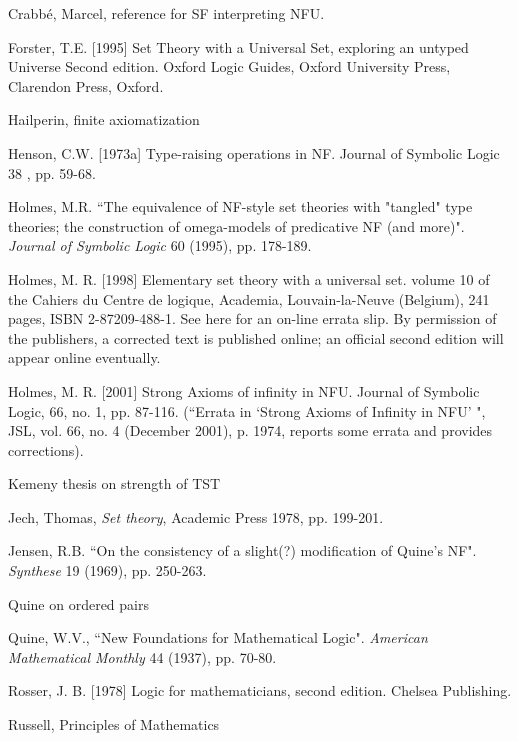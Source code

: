 \documentclass[112pt]{article}
\begin{document}
\begin{thebibliography}{99}


  Crabb\'e, Marcel, reference for SF interpreting NFU.


  Forster, T.E. [1995] 
Set Theory with a Universal Set, exploring an untyped Universe 
Second edition. Oxford Logic Guides, Oxford University Press, Clarendon Press, Oxford.

 Hailperin, finite axiomatization

   Henson, C.W. [1973a] 
Type-raising operations in NF. 
Journal of Symbolic Logic 38 , pp. 59-68.

  Holmes, M.R.
``The equivalence of NF-style set theories with "tangled" type theories; the construction of omega-models of predicative NF (and more)". 
{\em Journal of Symbolic Logic\/} 60 (1995), pp. 178-189.

  Holmes, M. R. [1998] 
Elementary set theory with a universal set. 
volume 10 of the Cahiers du Centre de logique, Academia, Louvain-la-Neuve (Belgium), 241 pages, ISBN 2-87209-488-1. See here for an on-line errata slip. By permission of the publishers, a corrected text is published online; an official second edition will appear online eventually.

   Holmes, M. R. [2001]
Strong Axioms of infinity in NFU.
Journal of Symbolic Logic, 66, no. 1, pp. 87-116.  \newline(``Errata in `Strong
Axioms of Infinity in NFU' ", JSL, vol. 66, no. 4 (December
2001), p. 1974, reports some errata and provides corrections).

  Kemeny thesis on strength of TST

  Jech, Thomas, {\em Set theory}, Academic Press 1978, pp. 199-201.

  Jensen, R.B.
``On the consistency of a slight(?) modification of Quine's NF". 
{\em Synthese\/} 19 (1969), pp. 250-263.

  Quine on ordered pairs

  Quine, W.V.,
``New Foundations for Mathematical Logic". 
{\em American Mathematical Monthly\/} 44 (1937), pp. 70-80. 

  Rosser, J. B. [1978] 
Logic for mathematicians, second edition. 
Chelsea Publishing.

  Russell, Principles of Mathematics


\end{thebibliography}
\end{document}

